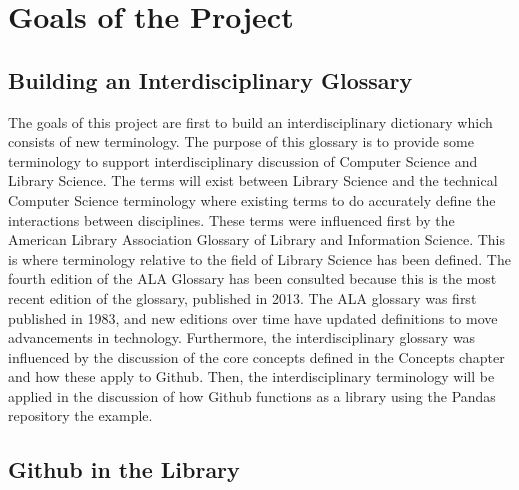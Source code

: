 \section{Goals of the Project}
\label{sec:goals}

\subsection{Building an Interdisciplinary Glossary}

The goals of this project are first to build an interdisciplinary dictionary which consists of new terminology. The purpose of this glossary is to provide some terminology to support interdisciplinary discussion of Computer Science and Library Science. The terms will exist between Library Science and the technical Computer Science terminology where existing terms to do accurately define the interactions between disciplines. These terms were influenced first by the American Library Association Glossary of Library and Information Science. This is where terminology relative to the field of Library Science has been defined. The fourth edition of the ALA Glossary has been consulted because this is the most recent edition of the glossary, published in 2013. The ALA glossary was first published in 1983, and new editions over time have updated definitions to move advancements in technology. Furthermore, the interdisciplinary glossary was influenced by the discussion of the core concepts defined in the Concepts chapter and how these apply to Github. Then, the interdisciplinary terminology will be applied in the discussion of how Github functions as a library using the Pandas repository the example. 

\subsection{Github in the Library}

